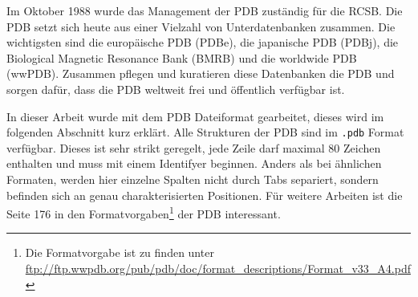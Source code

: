 Im Oktober 1988 wurde das Management der \ac{PDB} zuständig für die \ac{RCSB}. Die \ac{PDB} setzt sich heute aus einer Vielzahl von Unterdatenbanken zusammen. Die wichtigsten sind die europäische \ac{PDB} (PDBe), die japanische \ac{PDB} (PDBj), die Biological Magnetic Resonance Bank (BMRB) und die worldwide \ac{PDB} (wwPDB). Zusammen pflegen und kuratieren diese Datenbanken die \ac{PDB} und sorgen dafür, dass die \ac{PDB} weltweit frei und öffentlich verfügbar ist.


In dieser Arbeit wurde mit dem \ac{PDB} Dateiformat gearbeitet, dieses wird im folgenden Abschnitt kurz erklärt. Alle Strukturen der \ac{PDB} sind im \texttt{.pdb} Format verfügbar. Dieses ist sehr strikt geregelt, jede Zeile darf maximal 80 Zeichen enthalten und muss mit einem Identifyer beginnen. Anders als bei ähnlichen Formaten, werden hier einzelne Spalten nicht durch Tabs separiert, sondern befinden sich an genau charakterisierten Positionen. 
Für weitere Arbeiten ist die Seite 176 in den Formatvorgaben\footnote{Die Formatvorgabe ist zu finden unter \url{ftp://ftp.wwpdb.org/pub/pdb/doc/format_descriptions/Format_v33_A4.pdf}} der \ac{PDB} interessant.


